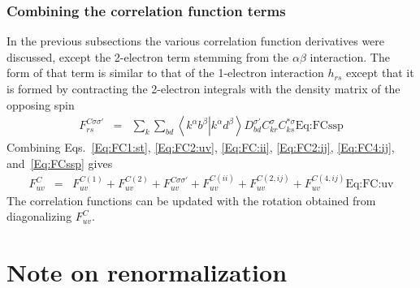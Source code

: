\documentclass[pra,nofootinbib]{revtex4-1}
\newcommand{\eria}[4]{\left\langle #1^\alpha #2^\beta \right.\left| #3^\alpha #4^\beta \right\rangle}
\newcommand{\dlabel}[1]{\text{#1}\label{#1}}
\begin{document}
\subsubsection{Combining the correlation function terms}

In the previous subsections the various correlation function derivatives
were discussed, except the 2-electron term stemming from the $\alpha\beta$
interaction. The form of that term is similar to that of the 1-electron
interaction $h_{rs}$ except that it is formed by contracting the
2-electron integrals with the density matrix of the opposing spin
\begin{eqnarray}
   F^{C\sigma\sigma'}_{rs}
   &=& \sum_{k}\sum_{bd}\eria{k}{b}{k}{d}D^{\sigma'}_{bd}
       C^\sigma_{kr}C^{*\sigma}_{ks}
       \dlabel{Eq:FCssp}
\end{eqnarray}
Combining Eqs.~\ref{Eq:FC1:st}, \ref{Eq:FC2:uv}, \ref{Eq:FC:ii},
\ref{Eq:FC2:ij}, \ref{Eq:FC4:ij}, and~\ref{Eq:FCssp} gives
\begin{eqnarray}
   F^{C}_{uv}
   &=& F^{C(1)}_{uv} + F^{C(2)}_{uv} + F^{C\sigma\sigma'}_{uv} +
       F^{C(ii)}_{uv} + F^{C(2,ij)}_{uv} + F^{C(4,ij)}_{uv}
       \dlabel{Eq:FC:uv}
\end{eqnarray}
The correlation functions can be updated with the rotation obtained
from diagonalizing $F^{C}_{uv}$.

\section{Note on renormalization}
\end{document}
